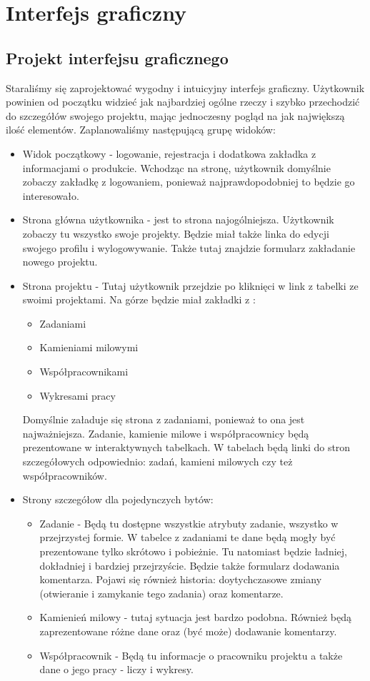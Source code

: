\documentclass[a4paper,12pt,notitlepage]{mwrep}
\begin{document}
\newpage
\section{Interfejs graficzny}

\subsection{Projekt interfejsu graficznego}
Staraliśmy się zaprojektować wygodny i intuicyjny interfejs graficzny. Użytkownik powinien od początku widzieć jak 
najbardziej ogólne rzeczy i szybko przechodzić do szczegółów swojego projektu, mając jednoczesny pogląd na jak 
największą ilość elementów. Zaplanowaliśmy następującą grupę widoków:
\begin{itemize}
	\item	Widok początkowy - logowanie, rejestracja i dodatkowa zakładka z informacjami o produkcie. Wchodząc na stronę, 
		użytkownik domyślnie zobaczy zakładkę z logowaniem, ponieważ najprawdopodobniej to będzie go interesowało.
	\item	Strona główna użytkownika - jest to strona najogólniejsza. Użytkownik zobaczy tu wszystko swoje projekty. Będzie miał 
		także linka do edycji swojego profilu i wylogowywanie. Także tutaj znajdzie formularz zakładanie nowego projektu.
	\item	Strona projektu - Tutaj użytkownik przejdzie po kliknięci w link z tabelki ze swoimi projektami. Na górze będzie miał 
		zakładki z :
	\begin{itemize}
		\item	Zadaniami
		\item	Kamieniami milowymi
		\item	Współpracownikami
		\item	Wykresami pracy
	\end{itemize}
		Domyślnie załaduje się strona z zadaniami, ponieważ to ona jest najważniejsza. Zadanie, kamienie milowe i współpracownicy 
		będą prezentowane w interaktywnych tabelkach. W tabelach będą linki do stron szczegółowych odpowiednio: zadań, 
		kamieni milowych czy też współpracowników.
	\item	Strony szczegółow dla pojedynczych bytów:
	\begin{itemize}
		\item	Zadanie - Będą tu dostępne wszystkie atrybuty zadanie, wszystko w przejrzystej formie. W tabelce z zadaniami te
			dane będą mogły być prezentowane tylko skrótowo i pobieżnie. Tu natomiast będzie ładniej, dokładniej i bardziej 
			przejrzyście. Będzie także formularz dodawania komentarza. Pojawi się również historia: doytychczasowe zmiany 
			(otwieranie i zamykanie tego zadania) oraz komentarze.
		\item	Kamienień milowy - tutaj sytuacja jest bardzo podobna. Również będą zaprezentowane różne dane oraz (być może) 
			dodawanie komentarzy.
		\item	Współpracownik - Będą tu informacje o pracowniku projektu a także dane o jego pracy - liczy i wykresy.
	\end{itemize}
\end{itemize}
\end{document}

